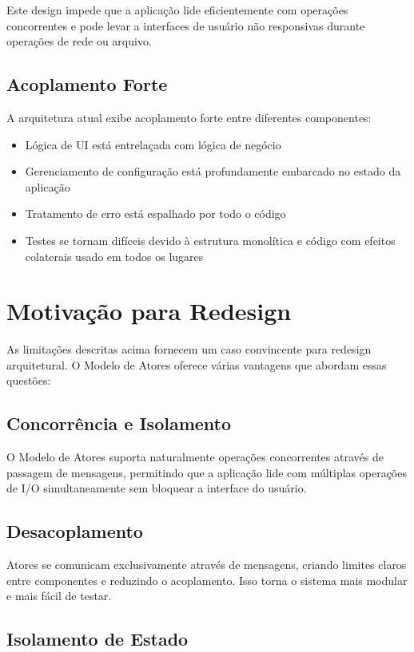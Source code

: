 Este design impede que a aplicação lide eficientemente com operações concorrentes e pode levar a interfaces de usuário não responsivas durante operações de rede ou arquivo.

\subsection{Acoplamento Forte}

A arquitetura atual exibe acoplamento forte entre diferentes componentes:

\begin{itemize}
    \item Lógica de UI está entrelaçada com lógica de negócio
    \item Gerenciamento de configuração está profundamente embarcado no estado da aplicação
    \item Tratamento de erro está espalhado por todo o código
    \item Testes se tornam difíceis devido à estrutura monolítica e código com efeitos colaterais usado em todos os lugares
\end{itemize}

\section{Motivação para Redesign}

As limitações descritas acima fornecem um caso convincente para redesign arquitetural. O Modelo de Atores oferece várias vantagens que abordam essas questões:

\subsection{Concorrência e Isolamento}

O Modelo de Atores suporta naturalmente operações concorrentes através de passagem de mensagens, permitindo que a aplicação lide com múltiplas operações de I/O simultaneamente sem bloquear a interface do usuário.

\subsection{Desacoplamento}

Atores se comunicam exclusivamente através de mensagens, criando limites claros entre componentes e reduzindo o acoplamento. Isso torna o sistema mais modular e mais fácil de testar.

\subsection{Isolamento de Estado}

